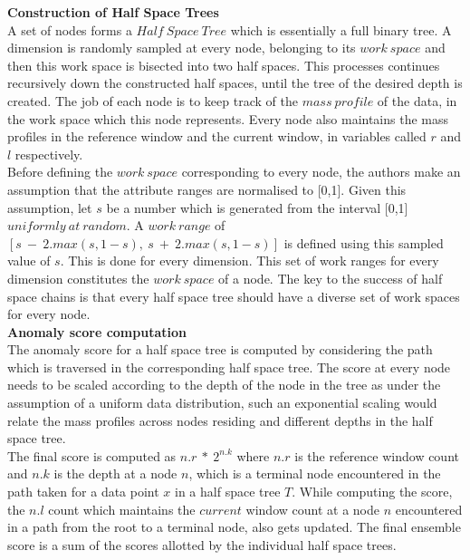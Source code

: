 \noindent \textbf{Construction of Half Space Trees} \\

A set of nodes forms a $Half\ Space\ Tree$ which is essentially a full binary tree. A dimension is randomly sampled at every node, belonging to its $work\ space$ and then this work space is bisected into two half spaces. This processes continues recursively down the constructed half spaces, until the tree of the desired depth is created. The job of each node is to keep track of the $mass\ profile$ of the data, in the work space which this node represents. Every node also maintains the mass profiles in the reference window and the current window, in variables called $r$ and $l$ respectively. \\

Before defining the $work\ space$ corresponding to every node, the authors make an assumption that the attribute ranges are normalised to [0,1]. Given this assumption, let $s$ be a number which is generated from the interval [0,1] $uniformly\ at\ random$. A $work\ range$ of $[s\ -\ 2.max(s,1-s),\ s\ +\ 2.max(s,1-s)]$ is defined using this sampled value of $s$. This is done for every dimension. This set of work ranges for every dimension constitutes the $work\ space$ of a node. The key to the success of half space chains is that every half space tree should have a diverse set of work spaces for every node. \\

\noindent \textbf{Anomaly score computation} \\

The anomaly score for a half space tree is computed by considering the path which is traversed in the corresponding half space tree. The score at every node needs to be scaled according to the depth of the node in the tree as under the assumption of a uniform data distribution, such an exponential scaling would relate the mass profiles across nodes residing and different depths in the half space tree. \\ 

The final score is computed as $n.r\ *\ 2^{n.k}$ where $n.r$ is the reference window count and $n.k$ is the depth at a node $n$, which is a terminal node encountered in the path taken for a data point $x$ in a half space tree $T$. While computing the score, the $n.l$ count which maintains the $current$ window count at a node $n$ encountered in a path from the root to a terminal node, also gets updated. The final ensemble score is a sum of the scores allotted by the individual half space trees. 


